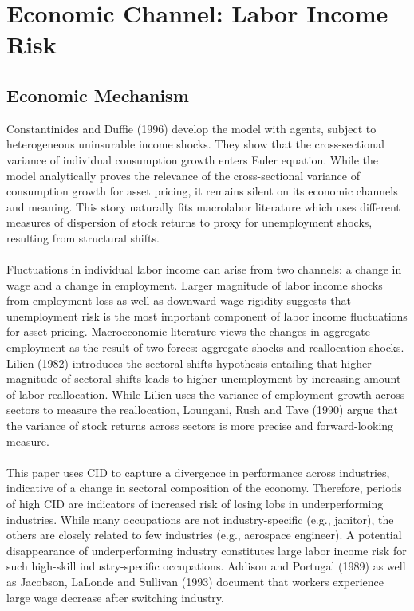 \documentclass[12pt]{article}
\begin{document}
\section{Economic Channel: Labor Income Risk} \label{sec:Model}

\subsection{Economic Mechanism}

Constantinides and Duffie (1996) develop the model with agents, subject to heterogeneous uninsurable income shocks. They show that the cross-sectional variance of individual consumption growth enters Euler equation. While the model analytically proves the relevance of the cross-sectional variance of consumption growth for asset pricing, it remains silent on its economic channels and meaning. This story naturally fits macrolabor literature which uses different measures of dispersion of stock returns to proxy for unemployment shocks, resulting from structural shifts.
\paragraph{}
Fluctuations in individual labor income can arise from two channels: a change in wage and a change in employment. Larger magnitude of labor income shocks from employment loss as well as downward wage rigidity suggests that unemployment risk is the most important component of labor income fluctuations for asset pricing. Macroeconomic literature views the changes in aggregate employment as the result of two forces: aggregate shocks and reallocation shocks. Lilien (1982) introduces the sectoral shifts hypothesis entailing that higher magnitude of sectoral shifts leads to higher unemployment by increasing amount of labor reallocation. While Lilien uses the variance of employment growth across sectors to measure the reallocation, Loungani, Rush and Tave (1990) argue that the variance of stock returns across sectors is more precise and forward-looking measure. 
\paragraph{}
This paper uses CID to capture a divergence in performance across industries, indicative of a change in sectoral composition of the economy. Therefore, periods of high CID are indicators of increased risk of losing lobs in underperforming industries. While many occupations are not industry-specific (e.g., janitor), the others are closely related to few industries (e.g., aerospace engineer). A potential disappearance of underperforming industry constitutes large labor income risk for such high-skill industry-specific occupations. Addison and Portugal (1989) as well as Jacobson, LaLonde and Sullivan (1993) document that workers experience large wage decrease after switching industry. 
\end{document}
